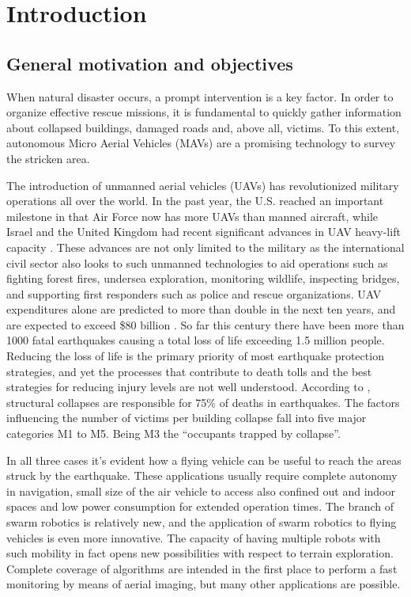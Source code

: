\chapter{Introduction}

\section{General motivation and objectives}

When natural disaster occurs, a prompt intervention is a key factor. In order to organize effective rescue missions, it is fundamental to quickly gather information about collapsed buildings, damaged roads and, above all, victims. To this extent, autonomous Micro Aerial Vehicles (MAVs) are a promising technology to survey the stricken area.

The introduction of unmanned aerial vehicles (UAVs) has revolutionized military operations all over the world. In the past year, the U.S. reached an important milestone in that Air Force now has more UAVs than manned aircraft, while Israel and the United Kingdom had recent significant advances in UAV heavy-lift capacity \cite{6099676}. These advances are not only limited to the military as the international civil sector also looks to such unmanned technologies to aid operations such as fighting forest fires, undersea exploration, monitoring wildlife, inspecting bridges, and supporting first responders such as police and rescue organizations. UAV expenditures alone are predicted to more than double in the next ten years, and are expected to exceed \$80 billion \cite{6099676}.
So far this century there have been more than 1000 fatal earthquakes causing a total loss of life exceeding 1.5 million people. Reducing the loss of life is the primary priority of most earthquake protection strategies, and yet the processes that contribute to death tolls and the best strategies for reducing injury levels are not well understood. According to \cite{coburn1994death}, structural collapses are responsible for 75\% of deaths in earthquakes. The factors influencing the number of victims per building collapse fall into five major categories M1 to M5. Being M3 the “occupants trapped by collapse”.

In all three cases it’s evident how a flying vehicle can be useful to reach the areas struck by the earthquake. 
These applications usually require complete autonomy in navigation, small size of the air vehicle to access also confined out and indoor spaces and low power consumption for extended operation times. The branch of swarm robotics is relatively new, and the application of swarm robotics to flying vehicles is even more innovative. The capacity of having multiple robots with such mobility in fact opens new possibilities with respect to terrain exploration. Complete coverage of algorithms are intended in the first place to perform a fast monitoring by means of aerial imaging, but many other applications are possible.

